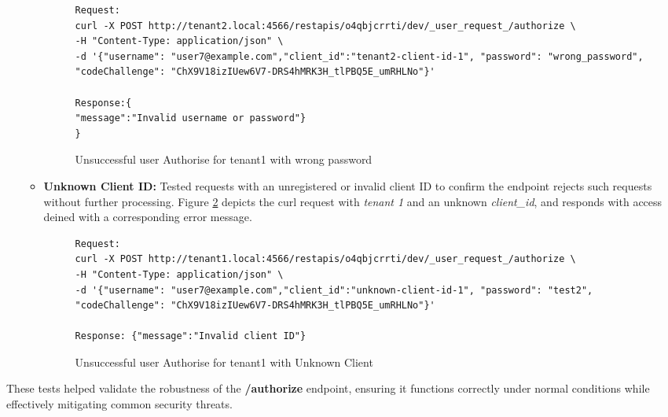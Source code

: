 \begin{enumerate}
\begin{itemize}
        \begin{figure}[!htbp]
    \centering
    \begin{lstlisting}[style=curlstyle]
Request:
curl -X POST http://tenant2.local:4566/restapis/o4qbjcrrti/dev/_user_request_/authorize \                                  
-H "Content-Type: application/json" \
-d '{"username": "user7@example.com","client_id":"tenant2-client-id-1", "password": "wrong_password", "codeChallenge": "ChX9V18izIUew6V7-DRS4hMRK3H_tlPBQ5E_umRHLNo"}'

Response:{
"message":"Invalid username or password"}
}
    \end{lstlisting}
    \caption{Unsuccessful user Authorise for tenant1 with wrong password}
    \label{fig:authorize_tenant_1_wrong_pass}
\end{figure}

        

       
        \item \textbf{Unknown Client ID:} Tested requests with an unregistered or invalid client ID to confirm the endpoint rejects such requests without further processing. Figure \ref{fig:authorize_tenant_1_unknown_client} depicts the curl request with \textit{tenant 1}
        and an unknown \textit{client\_id}, and responds with access deined with a corresponding error message.

\begin{figure}[!htbp]
    \centering
    \begin{lstlisting}[style=curlstyle]
Request:
curl -X POST http://tenant1.local:4566/restapis/o4qbjcrrti/dev/_user_request_/authorize \                                  
-H "Content-Type: application/json" \
-d '{"username": "user7@example.com","client_id":"unknown-client-id-1", "password": "test2", "codeChallenge": "ChX9V18izIUew6V7-DRS4hMRK3H_tlPBQ5E_umRHLNo"}'

Response: {"message":"Invalid client ID"}
    \end{lstlisting}
    \caption{Unsuccessful user Authorise for tenant1 with Unknown Client}
    \label{fig:authorize_tenant_1_unknown_client}
\end{figure}


    \end{itemize}
\end{enumerate}

These tests helped validate the robustness of the \textbf{/authorize} endpoint, ensuring it functions correctly under normal conditions while effectively mitigating common security threats.

